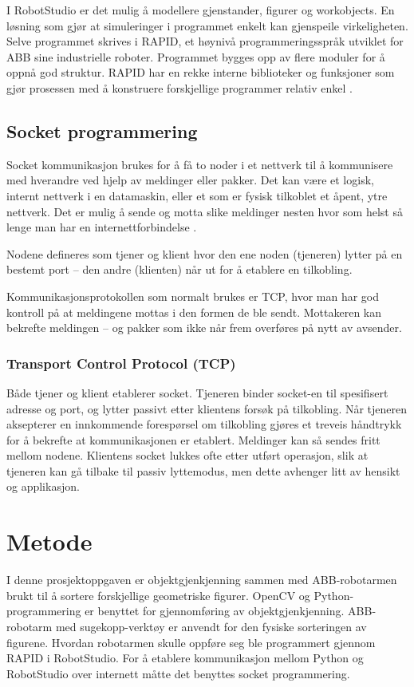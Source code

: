 \documentclass[conference]{IEEEtran}
\begin{document}
        I RobotStudio er det mulig å modellere gjenstander, figurer og workobjects. En løsning som gjør at simuleringer i programmet enkelt kan 
        gjenspeile virkeligheten. Selve programmet skrives i RAPID, et høynivå programmeringsspråk utviklet for ABB sine industrielle roboter. 
        Programmet bygges opp av flere moduler for å oppnå god struktur. RAPID har en rekke interne biblioteker og funksjoner som gjør prosessen 
        med å konstruere forskjellige programmer relativ enkel \cite{teori:RobStud} \cite{teori:RobStud1}. 

    \subsection{Socket programmering}
        Socket kommunikasjon brukes for å få to noder i et nettverk til å kommunisere med hverandre ved hjelp av meldinger eller pakker. Det kan 
        være et logisk, internt nettverk i en datamaskin, eller et som er fysisk tilkoblet et åpent, ytre nettverk. Det er mulig å sende og motta 
        slike meldinger nesten hvor som helst så lenge man har en internettforbindelse \cite{teori:socket}.

        Nodene defineres som tjener og klient hvor den ene noden (tjeneren) lytter på en bestemt port – den andre (klienten) når ut for å etablere 
        en tilkobling.

        Kommunikasjonsprotokollen som normalt brukes er TCP, hvor man har god kontroll på at meldingene mottas i den formen de ble sendt. Mottakeren 
        kan bekrefte meldingen – og pakker som ikke når frem overføres på nytt av avsender.

        \subsubsection{Transport Control Protocol (TCP)}
            Både tjener og klient etablerer socket. Tjeneren binder socket-en til spesifisert adresse og port, og lytter passivt etter klientens 
            forsøk på tilkobling. Når tjeneren aksepterer en innkommende forespørsel om tilkobling gjøres et treveis håndtrykk for å bekrefte at 
            kommunikasjonen er etablert. Meldinger kan så sendes fritt mellom nodene. Klientens socket lukkes ofte etter utført operasjon, slik at 
            tjeneren kan gå tilbake til passiv lyttemodus, men dette avhenger litt av hensikt og applikasjon.
    
\section{Metode}
    I denne prosjektoppgaven er objektgjenkjenning sammen med ABB-robotarmen brukt til å sortere forskjellige geometriske figurer. OpenCV og 
    Python-programmering er benyttet for gjennomføring av objektgjenkjenning. ABB-robotarm med sugekopp-verktøy er anvendt for den fysiske 
    sorteringen av figurene. Hvordan robotarmen skulle oppføre seg ble programmert gjennom RAPID i RobotStudio. For å etablere kommunikasjon 
    mellom Python og RobotStudio over internett måtte det benyttes socket programmering.
\end{document}
